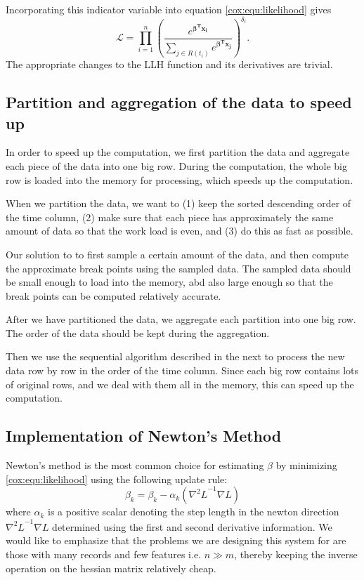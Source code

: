 Incorporating this indicator variable into equation \ref{cox:equ:likelihood} gives
\begin{equation}\label{cox:equ:likelihood-censoring}
\mathcal{L} = \prod_{i = 1}^n \left(  \frac{e^{\mathbf{\beta^T x_i} }}{ \sum_{j \in R(t_i)} e^{\mathbf{\beta^T x_j}}} \right)^{\delta_i}.
\end{equation}
The appropriate changes to the LLH function and its derivatives are trivial.


\subsection{Partition and aggregation of the data to speed up}

In order to speed up the computation, we first partition the data and
aggregate each piece of the data into one big row. During the
computation, the whole big row is loaded into the memory for
processing, which speeds up the computation.

When we partition the data, we want to (1) keep the sorted descending
order of the time column, (2) make sure that each piece has
approximately the same amount of data so that the work load is even,
and (3) do this as fast as possible.

Our solution to to first sample a certain amount of the data, and then
compute the approximate break points using the sampled data. The
sampled data should be small enough to load into the memory, abd also
large enough so that the break points can be computed relatively
accurate.

After we have partitioned the data, we aggregate each partition into
one big row. The order of the data should be kept during the
aggregation.

Then we use the sequential algorithm described in the next to process
the new data row by row in the order of the time column. Since each
big row contains lots of original rows, and we deal with them all in
the memory, this can speed up the computation.


\subsection{Implementation of Newton's Method}
Newton's method is the most common choice for estimating $\beta$ by minimizing
\ref{cox:equ:likelihood} using the following update rule:
\begin{equation}
\beta_{k} = \beta_{k} - \alpha_k \left( {\nabla^2 L}^{-1} \nabla L \right)
\end{equation}
where $\alpha_k$ is a positive scalar denoting the step length in the newton
direction ${\nabla^2 L}^{-1} \nabla L$ determined using the first and second
derivative information. We would like to emphasize that the problems we are
designing this system for are those with many records and few features i.e. $n
\gg m$, thereby keeping the inverse operation on the hessian matrix relatively
cheap.

